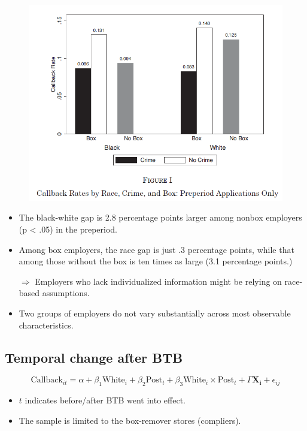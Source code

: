 \documentclass[../root]{subfiles}
\begin{document}
    \begin{figure}[ht]
        \centering
        \includegraphics[scale = .8]{0925tanji/F1}
    \end{figure}

    \begin{itemize}
      \item The black-white gap is 2.8 percentage points larger among nonbox employers (p < .05) in the preperiod.
      \item Among box employers, the race gap is just .3 percentage points, while that among those without the box is ten times as large (3.1 percentage points.)

      $\Rightarrow$ Employers who lack individualized information might be relying on race-based assumptions.

      \item Two groups of employers do not vary substantially across most observable characteristics.
    \end{itemize}

    \subsection{Temporal change after BTB}

    \[
    \text{Callback}_{it} = \alpha + \beta_1 \text{White}_i + \beta_2 \text{Post}_t + \beta_3 \text{White}_i \times \text{Post}_t + \Gamma \mathbf{X_i} + \epsilon_{ij}
    \]

    \begin{itemize}
      \item $t$ indicates before/after BTB went into effect.
      \item The sample is limited to the box-remover stores (compliers).
    \end{itemize}
\end{document}
